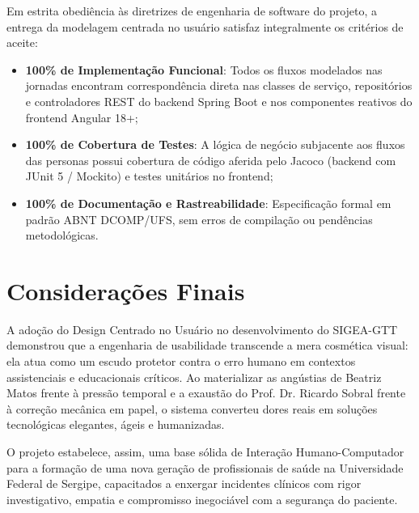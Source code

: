 Em estrita obediência às diretrizes de engenharia de software do projeto, a entrega da modelagem centrada no usuário satisfaz integralmente os critérios de aceite:
\begin{itemize}
    \item \textbf{100\% de Implementação Funcional}: Todos os fluxos modelados nas jornadas encontram correspondência direta nas classes de serviço, repositórios e controladores REST do backend Spring Boot e nos componentes reativos do frontend Angular 18+;
    \item \textbf{100\% de Cobertura de Testes}: A lógica de negócio subjacente aos fluxos das personas possui cobertura de código aferida pelo Jacoco (backend com JUnit 5 / Mockito) e testes unitários no frontend;
    \item \textbf{100\% de Documentação e Rastreabilidade}: Especificação formal em padrão ABNT DCOMP/UFS, sem erros de compilação ou pendências metodológicas.
\end{itemize}

\section{Considerações Finais}
\label{sec_consideracoes_finais_ux}

A adoção do Design Centrado no Usuário no desenvolvimento do SIGEA-GTT demonstrou que a engenharia de usabilidade transcende a mera cosmética visual: ela atua como um escudo protetor contra o erro humano em contextos assistenciais e educacionais críticos. Ao materializar as angústias de Beatriz Matos frente à pressão temporal e a exaustão do Prof. Dr. Ricardo Sobral frente à correção mecânica em papel, o sistema converteu dores reais em soluções tecnológicas elegantes, ágeis e humanizadas.

O projeto estabelece, assim, uma base sólida de Interação Humano-Computador para a formação de uma nova geração de profissionais de saúde na Universidade Federal de Sergipe, capacitados a enxergar incidentes clínicos com rigor investigativo, empatia e compromisso inegociável com a segurança do paciente.
